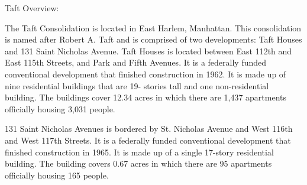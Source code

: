 Taft Overview:    

  

The Taft Consolidation is located in East Harlem, Manhattan. This consolidation is named after Robert A. Taft and is comprised of two developments: Taft Houses and 131 Saint Nicholas Avenue. Taft Houses is located between East 112th and East 115th Streets, and Park and Fifth Avenues. It is a federally funded conventional development that finished construction in 1962. It is made up of nine residential buildings that are 19- stories tall and one non-residential building. The buildings cover 12.34 acres in which there are 1,437 apartments officially housing 3,031 people.

131 Saint Nicholas Avenues is bordered by St. Nicholas Avenue and West 116th and West 117th Streets. It is a federally funded conventional development that finished construction in 1965. It is made up of  a single 17-story residential building. The building covers 0.67 acres in which there are 95 apartments officially housing 165 people.